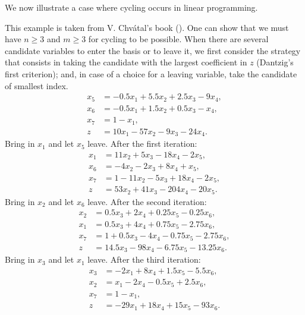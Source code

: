 \begin{example}
    We now illustrate a case where cycling occurs in linear programming.
    
    This example is taken from V. Chvátal’s book (\cite{chvatal1983}). One can show that we must have \(n\ge 3\) and \(m\ge 3\) for cycling to be possible.
    When there are several candidate variables to enter the basis or to leave it, we first consider the strategy that consists in taking the candidate with the largest coefficient in \(z\) (Dantzig’s first criterion); and, in case of a choice for a leaving variable, take the candidate of smallest index.
    \[
        \begin{aligned}
        x_5 &= -0.5x_1 + 5.5x_2 + 2.5x_3 - 9x_4,\\
        x_6 &= -0.5x_1 + 1.5x_2 + 0.5x_3 - x_4,\\
        x_7 &= 1 - x_1,\\
        \hline
        z &= 10x_1 - 57x_2 - 9x_3 - 24x_4.
        \end{aligned}
    \]
    Bring in \(x_1\) and let \(x_5\) leave. After the first iteration:
    \[
        \begin{aligned}
        x_1 &= 11x_2 + 5x_3 - 18x_4 - 2x_5,\\
        x_6 &= -4x_2 - 2x_3 + 8x_4 + x_5,\\
        x_7 &= 1 - 11x_2 - 5x_3 + 18x_4 - 2x_5,\\
        \hline
        z &= 53x_2 + 41x_3 - 204x_4 - 20x_5.
        \end{aligned}
    \]
    Bring in \(x_2\) and let \(x_6\) leave. After the second iteration:
    \[
        \begin{aligned}
        x_2 &= 0.5x_3 + 2x_4 + 0.25x_5 - 0.25x_6,\\
        x_1 &= 0.5x_3 + 4x_4 + 0.75x_5 - 2.75x_6,\\
        x_7 &= 1 + 0.5x_3 - 4x_4 - 0.75x_5 - 2.75x_6,\\
        \hline
        z &= 14.5x_3 - 98x_4 - 6.75x_5 - 13.25x_6.
        \end{aligned}
    \]
    Bring in \(x_3\) and let \(x_1\) leave. After the third iteration:
    \[
        \begin{aligned}
        x_3 &= -2x_1 + 8x_4 + 1.5x_5 - 5.5x_6,\\
        x_2 &= x_1 - 2x_4 - 0.5x_5 + 2.5x_6,\\
        x_7 &= 1 - x_1,\\
        \hline
        z &= -29x_1 + 18x_4 + 15x_5 - 93x_6.

\end{aligned}\]
\end{example}
